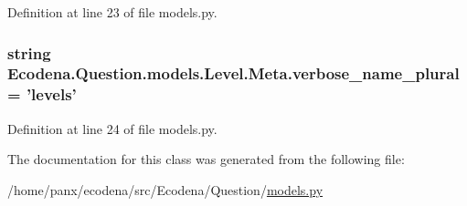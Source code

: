 Definition at line 23 of file models.py.

\hypertarget{class_ecodena_1_1_question_1_1models_1_1_level_1_1_meta_a0bcd87e70ea14c111af94c17deb2257e}{
\subsubsection[{verbose\_\-name\_\-plural}]{\setlength{\rightskip}{0pt plus 5cm}string {\bf Ecodena.Question.models.Level.Meta.verbose\_\-name\_\-plural} = 'levels'}}
\label{dd/dc4/class_ecodena_1_1_question_1_1models_1_1_level_1_1_meta_a0bcd87e70ea14c111af94c17deb2257e}


Definition at line 24 of file models.py.



The documentation for this class was generated from the following file:\begin{DoxyCompactItemize}
\item 
/home/panx/ecodena/src/Ecodena/Question/\hyperlink{_question_2models_8py}{models.py}\end{DoxyCompactItemize}
